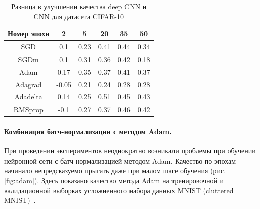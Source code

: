 \documentclass[12pt]{article}
\begin{document}
\begin{table}[h!]
\centering

\begin{minipage}{0.45\linewidth}

\begin{tabular}{|c|c|c|c|c|c|}\hline
\textbf{Номер эпохи} & \textbf{2} & \textbf{5} & \textbf{20} & \textbf{35} & \textbf{50} \\\hline
SGD & \color{green}0.1 & \color{green}0.23 & \color{green}0.41 & \color{green}0.44 & \color{green}0.34 \\\hline

SGDm & \color{green}0.1 & \color{green}0.31 & \color{green}0.36 & \color{green}0.42 & \color{green}0.18 \\\hline

Adam & \color{green}0.17 & \color{green}0.35 & \color{green}0.37 & \color{green}0.41 & \color{green}0.37 \\\hline

Adagrad & \color{red}-0.05 & \color{green}0.21 & \color{green}0.24 & \color{green}0.28 & \color{green}0.28 \\\hline

Adadelta & \color{green}0.14 & \color{green}0.25 & \color{green}0.51 & \color{green}0.45 & \color{green}0.43 \\\hline

RMSprop & \color{red}-0.1 & \color{green}0.27 & \color{green}0.37 & \color{green}0.46 & \color{green}0.42 \\\hline

\end{tabular}
\end{minipage}
\caption{\small Разница в улучшении качества deep CNN и CNN для датасета CIFAR-10} \label{table:deep.minus.cnn}
\end{table}

\newpage
\paragraph{Комбинация батч-нормализации с методом Adam.\\}

При проведении экспериментов неоднократно возникали проблемы при обучении нейронной сети с батч-нормализацией методом Adam. Качество по эпохам начинало непредсказуемо прыгать даже при малом шаге обучения (рис. \ref{fig:adam}). Здесь показано качество метода Adam на тренировочной и валидационной выборках усложненного набора данных MNIST (cluttered MNIST)~\cite{clmnist}.
\end{document}
